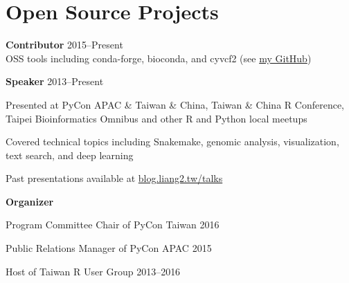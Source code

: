 \section{Open Source Projects}

\begin{entrylist}

\item \normalsize \textbf{Contributor}\hfill
    2015--Present\\

    \small
    OSS tools including conda-forge, bioconda, and cyvcf2
    (see \href{https://github.com/ccwang002}{my GitHub})

\item \normalsize \textbf{Speaker}\hfill
    2013--Present\\
    \small

    \begin{detaillist}[leftmargin=*, labelsep=0.5em]
        \item Presented at PyCon APAC \& Taiwan \& China, Taiwan \& China R Conference, Taipei Bioinformatics Omnibus and other R and Python local meetups
        \item Covered technical topics including Snakemake, genomic analysis, visualization, text search, and deep learning
        \item Past presentations available at \href{https://blog.liang2.tw/talks/}{blog.liang2.tw/talks}
    \end{detaillist}

\item \normalsize \textbf{Organizer}

    \begin{detaillist}[leftmargin=*, labelsep=0.5em]
        \item Program Committee Chair of PyCon Taiwan 2016
        \item Public Relations Manager of PyCon APAC 2015
        \item Host of Taiwan R User Group 2013--2016
    \end{detaillist}

\end{entrylist}
